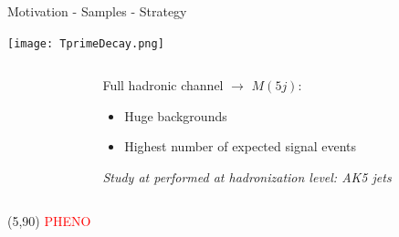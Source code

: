\begin{frame}{Motivation - Samples - Strategy}
\vspace{-1.0cm}

\begin{center}
  \texttt{[image: TprimeDecay.png]}
\end{center}

\vspace{-.5cm}
\begin{columns}
\begin{column}{.60\textwidth}
\end{column}
\begin{column}{.40\textwidth}
\begin{block}{}\tiny
Full hadronic channel $\to$ $M(5j)$:
  \begin{itemize}\tiny
  \item Huge backgrounds
  \item Highest number of expected signal events
  \end{itemize}
\textit{Study at performed at hadronization level: AK5 jets}
\end{block}
\end{column}
\end{columns}

\begin{textblock}{50}(5,90)
\textcolor{red}{PHENO}
\end{textblock}

\end{frame}

